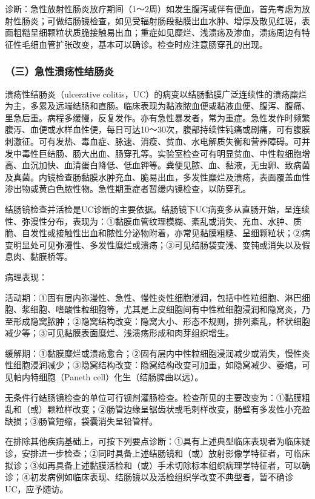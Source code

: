 诊断：急性放射性肠炎放疗期间（1～2周）如发生腹泻或伴有便血，首先考虑为放射性肠炎；可做结肠镜检查，如见受辐射肠段黏膜出血水肿、增厚及散见红斑，表面粗糙呈细颗粒状质脆接触易出血；重症如见糜烂、浅溃疡及渗血，溃疡周边有特征性毛细血管扩张改变，基本可以确诊。检查时应注意肠穿孔的出现。

\subsubsection{（三）急性溃疡性结肠炎}

溃疡性结肠炎（ulcerative
colitis，UC）的病变以结肠黏膜广泛连续性的溃疡糜烂为主，多累及远端结肠和直肠。临床表现为黏液脓血便或黏液血便、腹泻、腹痛、里急后重。病程多缓慢，反复发作。亦有急性暴发者，常为重症。急性发作时频繁腹泻、血便或水样血性便，每日可达10～30次，腹部持续性钝痛或剧痛，可有腹膜刺激征。可有发热、毒血症、脉速、消瘦、贫血、水电解质失衡和营养障碍。可并发中毒性巨结肠、肠大出血、肠穿孔等。实验室检查可有明显贫血、中性粒细胞增高、血沉加快、血清蛋白降低、低血钾等。粪便见脓、血、黏液，无虫卵、致病菌及真菌。内镜检查肠黏膜水肿充血、脆易出血，多发性糜烂及溃疡，表面覆盖血性渗出物或黄白色脓性物。急性期重症者暂缓内镜检查，以防穿孔。

结肠镜检查并活检是UC诊断的主要依据。结肠镜下UC病变多从直肠开始，呈连续性、弥漫性分布，表现为：①黏膜血管纹理模糊、紊乱或消失、充血、水肿、质脆、自发性或接触性出血和脓性分泌物附着，亦常见黏膜粗糙、呈细颗粒状；②病变明显处可见弥漫性、多发性糜烂或溃疡；③可见结肠袋变浅、变钝或消失以及假息肉、黏膜桥等。

病理表现：

活动期：①固有层内弥漫性、急性、慢性炎性细胞浸润，包括中性粒细胞、淋巴细胞、浆细胞、嗜酸性粒细胞等，尤其是上皮细胞间有中性粒细胞浸润和隐窝炎，乃至形成隐窝脓肿；②隐窝结构改变：隐窝大小、形态不规则，排列紊乱，杯状细胞减少等；③可见黏膜表面糜烂、浅溃疡形成和肉芽组织增生。

缓解期：①黏膜糜烂或溃疡愈合；②固有层内中性粒细胞浸润减少或消失，慢性炎性细胞浸润减少；③隐窝结构改变：隐窝结构改变可加重，如隐窝减少、萎缩，可见帕内特细胞（Paneth
cell）化生（结肠脾曲以远）。

无条件行结肠镜检查的单位可行钡剂灌肠检查。检查所见的主要改变为：①黏膜粗乱和（或）颗粒样改变；②肠管边缘呈锯齿状或毛刺样改变，肠壁有多发性小充盈缺损；③肠管短缩，袋囊消失呈铅管样。

在排除其他疾病基础上，可按下列要点诊断：①具有上述典型临床表现者为临床疑诊，安排进一步检查；②同时具备上述结肠镜和（或）放射影像学特征者，可临床拟诊；③如再具备上述黏膜活检和（或）手术切除标本组织病理学特征者，可以确诊；④初发病例如临床表现、结肠镜以及活检组织学改变不典型者，暂不确诊UC，应予随访。

